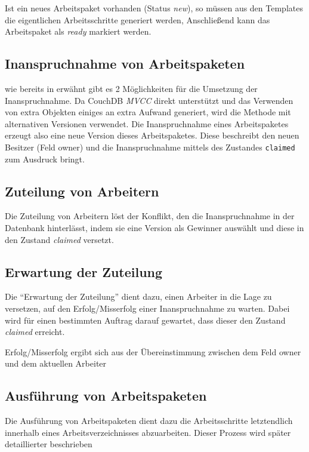Ist ein neues Arbeitspaket vorhanden (Status \textit{new}), so müssen aus den Templates die eigentlichen Arbeitsschritte generiert werden,
Anschließend kann das Arbeitspaket als \textit{ready} markiert werden.

\subsection{Inanspruchnahme von Arbeitspaketen}

wie bereits in  erwähnt gibt es 2 Möglichkeiten für die Umsetzung der Inanspruchnahme.
Da CouchDB \emph{MVCC} direkt unterstützt und das Verwenden von extra Objekten einiges an extra Aufwand generiert, wird die Methode mit alternativen Versionen verwendet.
Die Inanspruchnahme eines Arbeitspaketes erzeugt also eine neue Version dieses Arbeitspaketes.
Diese beschreibt den neuen Besitzer (Feld owner) und die Inanspruchnahme mittels des Zustandes \verb|claimed|
zum Ausdruck bringt.

\subsection{Zuteilung von Arbeitern}
Die Zuteilung von Arbeitern löst der Konflikt,
den die Inanspruchnahme in der Datenbank hinterlässt,
indem sie eine Version als Gewinner auswählt und
diese in den Zustand \textit{claimed} versetzt.

\subsection{Erwartung der Zuteilung}

Die ``Erwartung der Zuteilung'' dient dazu,
einen Arbeiter in die Lage zu versetzen,
auf den Erfolg/Misserfolg einer Inanspruchnahme zu warten.
Dabei wird für einen bestimmten Auftrag darauf gewartet,
dass dieser den Zustand \textit{claimed} erreicht.

Erfolg/Misserfolg ergibt sich aus der Übereinstimmung zwischen dem Feld owner und dem aktuellen Arbeiter

\subsection{Ausführung von Arbeitspaketen}

Die Ausführung von Arbeitspaketen dient dazu die Arbeitsschritte letztendlich innerhalb eines Arbeitsverzeichnisses abzuarbeiten.
Dieser Prozess wird später detaillierter beschrieben



